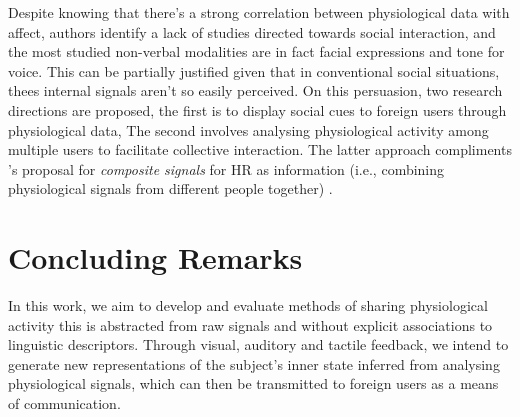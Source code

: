 Despite knowing that there's a strong correlation between physiological data with affect, authors identify a lack of studies directed towards social interaction, and the most studied non-verbal modalities are in fact facial expressions and tone for voice. This can be partially justified given that in conventional social situations, thees internal signals aren't so easily perceived. On this persuasion, two research directions are proposed, the first is to display social cues to foreign users through physiological data, The second involves analysing physiological activity among multiple users to facilitate collective interaction. The latter approach compliments \citeauthor{slovak_understanding_2012}'s proposal for \textit{composite signals} for HR as information (i.e., combining physiological signals from different people together) \cite{slovak_understanding_2012}.




\section{Concluding Remarks}
\label{lit_review:conclusion}

In this work, we aim to develop and evaluate methods of sharing physiological activity this is abstracted from raw signals and without explicit associations to linguistic descriptors. Through visual, auditory and tactile feedback, we intend to generate new representations of the subject's inner state inferred from analysing physiological signals, which can then be transmitted to foreign users as a means of communication.  

